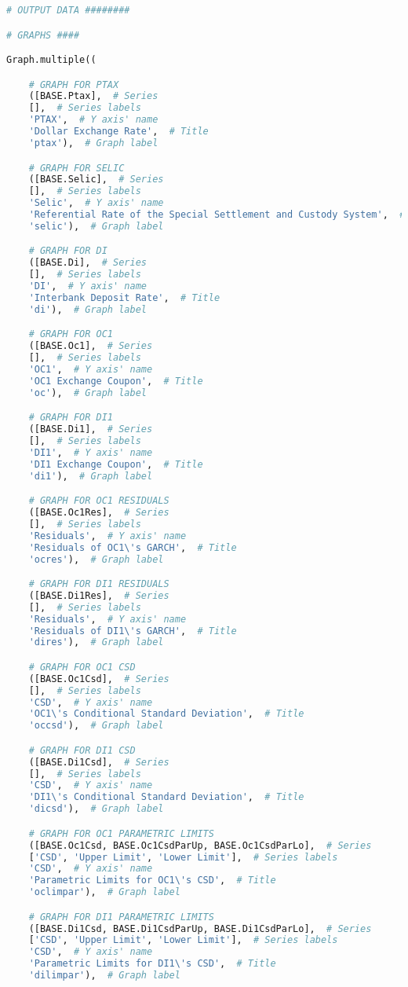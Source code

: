 \begin{lstlisting}[language=Python]
# OUTPUT DATA ########

# GRAPHS ####

Graph.multiple((

    # GRAPH FOR PTAX
    ([BASE.Ptax],  # Series
    [],  # Series labels
    'PTAX',  # Y axis' name
    'Dollar Exchange Rate',  # Title
    'ptax'),  # Graph label

    # GRAPH FOR SELIC
    ([BASE.Selic],  # Series
    [],  # Series labels
    'Selic',  # Y axis' name
    'Referential Rate of the Special Settlement and Custody System',  # Title
    'selic'),  # Graph label

    # GRAPH FOR DI
    ([BASE.Di],  # Series
    [],  # Series labels
    'DI',  # Y axis' name
    'Interbank Deposit Rate',  # Title
    'di'),  # Graph label

    # GRAPH FOR OC1
    ([BASE.Oc1],  # Series
    [],  # Series labels
    'OC1',  # Y axis' name
    'OC1 Exchange Coupon',  # Title
    'oc'),  # Graph label

    # GRAPH FOR DI1
    ([BASE.Di1],  # Series
    [],  # Series labels
    'DI1',  # Y axis' name
    'DI1 Exchange Coupon',  # Title
    'di1'),  # Graph label

    # GRAPH FOR OC1 RESIDUALS
    ([BASE.Oc1Res],  # Series
    [],  # Series labels
    'Residuals',  # Y axis' name
    'Residuals of OC1\'s GARCH',  # Title
    'ocres'),  # Graph label

    # GRAPH FOR DI1 RESIDUALS
    ([BASE.Di1Res],  # Series
    [],  # Series labels
    'Residuals',  # Y axis' name
    'Residuals of DI1\'s GARCH',  # Title
    'dires'),  # Graph label

    # GRAPH FOR OC1 CSD
    ([BASE.Oc1Csd],  # Series
    [],  # Series labels
    'CSD',  # Y axis' name
    'OC1\'s Conditional Standard Deviation',  # Title
    'occsd'),  # Graph label

    # GRAPH FOR DI1 CSD
    ([BASE.Di1Csd],  # Series
    [],  # Series labels
    'CSD',  # Y axis' name
    'DI1\'s Conditional Standard Deviation',  # Title
    'dicsd'),  # Graph label

    # GRAPH FOR OC1 PARAMETRIC LIMITS
    ([BASE.Oc1Csd, BASE.Oc1CsdParUp, BASE.Oc1CsdParLo],  # Series
    ['CSD', 'Upper Limit', 'Lower Limit'],  # Series labels
    'CSD',  # Y axis' name
    'Parametric Limits for OC1\'s CSD',  # Title
    'oclimpar'),  # Graph label

    # GRAPH FOR DI1 PARAMETRIC LIMITS
    ([BASE.Di1Csd, BASE.Di1CsdParUp, BASE.Di1CsdParLo],  # Series
    ['CSD', 'Upper Limit', 'Lower Limit'],  # Series labels
    'CSD',  # Y axis' name
    'Parametric Limits for DI1\'s CSD',  # Title
    'dilimpar'),  # Graph label


\end{lstlisting}

